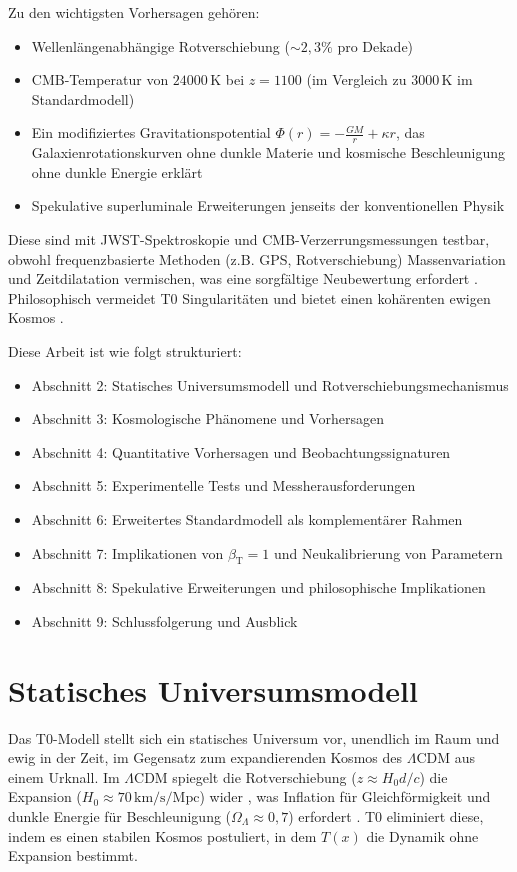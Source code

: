 \documentclass[12pt,a4paper]{article}
\newcommand{\Tfield}{T(x)}
\newcommand{\betaT}{\beta_{\text{T}}}
\newcommand{\LCDM}{\Lambda\text{CDM}}
\begin{document}
	Zu den wichtigsten Vorhersagen gehören:
	\begin{itemize}
		\item Wellenlängenabhängige Rotverschiebung (\(\sim 2,3\%\) pro Dekade)
		\item CMB-Temperatur von \(24000 \, \text{K}\) bei \(z = 1100\) (im Vergleich zu \(3000 \, \text{K}\) im Standardmodell)
		\item Ein modifiziertes Gravitationspotential \(\Phi(r) = -\frac{GM}{r} + \kappa r\), das Galaxienrotationskurven ohne dunkle Materie und kosmische Beschleunigung ohne dunkle Energie erklärt
		\item Spekulative superluminale Erweiterungen jenseits der konventionellen Physik
	\end{itemize}
	
	Diese sind mit JWST-Spektroskopie und CMB-Verzerrungsmessungen testbar, obwohl frequenzbasierte Methoden (z.B. GPS, Rotverschiebung) Massenvariation und Zeitdilatation vermischen, was eine sorgfältige Neubewertung erfordert \cite{pascher_quantum_2025}. Philosophisch vermeidet T0 Singularitäten und bietet einen kohärenten ewigen Kosmos \cite{pascher_perspective_2025}.
	
	Diese Arbeit ist wie folgt strukturiert:
	\begin{itemize}
		\item Abschnitt 2: Statisches Universumsmodell und Rotverschiebungsmechanismus
		\item Abschnitt 3: Kosmologische Phänomene und Vorhersagen
		\item Abschnitt 4: Quantitative Vorhersagen und Beobachtungssignaturen
		\item Abschnitt 5: Experimentelle Tests und Messherausforderungen
		\item Abschnitt 6: Erweitertes Standardmodell als komplementärer Rahmen
		\item Abschnitt 7: Implikationen von \(\betaT = 1\) und Neukalibrierung von Parametern
		\item Abschnitt 8: Spekulative Erweiterungen und philosophische Implikationen
		\item Abschnitt 9: Schlussfolgerung und Ausblick
	\end{itemize}
	
	\section{Statisches Universumsmodell}
	Das T0-Modell stellt sich ein statisches Universum vor, unendlich im Raum und ewig in der Zeit, im Gegensatz zum expandierenden Kosmos des \(\LCDM\) aus einem Urknall. Im \(\LCDM\) spiegelt die Rotverschiebung (\(z \approx H_0 d / c\)) die Expansion (\(H_0 \approx 70 \, \text{km/s/Mpc}\)) wider \cite{Planck2020}, was Inflation für Gleichförmigkeit und dunkle Energie für Beschleunigung (\(\Omega_{\Lambda} \approx 0,7\)) erfordert \cite{Riess1998}. T0 eliminiert diese, indem es einen stabilen Kosmos postuliert, in dem \(\Tfield\) die Dynamik ohne Expansion bestimmt.
	
\end{document}
